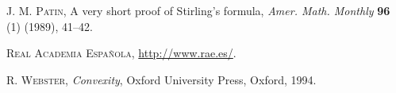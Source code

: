\documentclass[11pt]{book}
\newcommand{\clearemptydoublepage}{\newpage{\pagestyle{empty}\cleardoublepage}}
\theoremstyle{plain} %
\theoremstyle{definition} %
\begin{document}
\begin{thebibliography}{99}
\textsc{J. M. Patin},
A very short proof of Stirling's formula,
\textit{Amer. Math. Monthly}
\textbf{96} (1) (1989), 41--42.

\textsc{Real Academia Española},
\url{http://www.rae.es/}.


\textsc{R. Webster},
\textit{Convexity},
Oxford University Press, Oxford, 1994.

\end{thebibliography}

\end{document}
